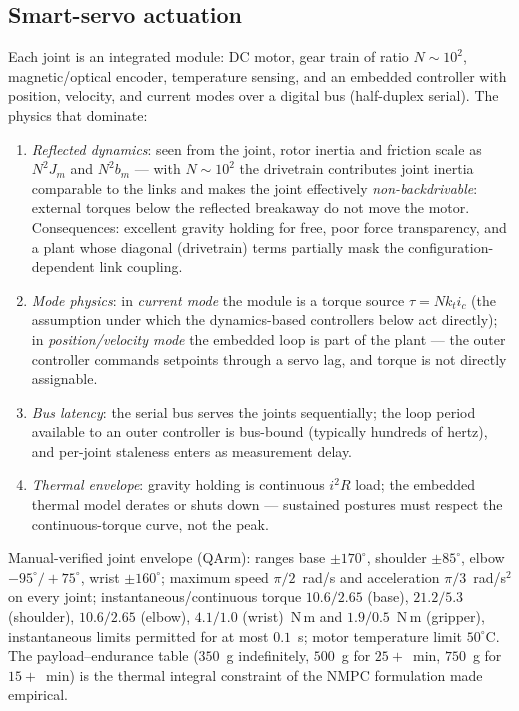 \documentclass[conference]{IEEEtran}
\begin{document}
\subsection{Smart-servo actuation}
Each joint is an integrated module: DC motor, gear train of ratio $N\!\sim\!10^2$, magnetic/optical encoder, temperature sensing, and an embedded controller with position, velocity, and current modes over a digital bus (half-duplex serial). The physics that dominate:
\begin{enumerate}[label=(\alph*)]
\item \emph{Reflected dynamics}: seen from the joint, rotor inertia and friction scale as $N^2 J_m$ and $N^2 b_m$ --- with $N\sim10^2$ the drivetrain contributes joint inertia comparable to the links and makes the joint effectively \emph{non-backdrivable}: external torques below the reflected breakaway do not move the motor. Consequences: excellent gravity holding for free, poor force transparency, and a plant whose diagonal (drivetrain) terms partially mask the configuration-dependent link coupling.
\item \emph{Mode physics}: in \emph{current mode} the module is a torque source $\tau = N k_t i_c$ (the assumption under which the dynamics-based controllers below act directly); in \emph{position/velocity mode} the embedded loop is part of the plant --- the outer controller commands setpoints through a servo lag, and torque is not directly assignable.
\item \emph{Bus latency}: the serial bus serves the joints sequentially; the loop period available to an outer controller is bus-bound (typically hundreds of hertz), and per-joint staleness enters as measurement delay.
\item \emph{Thermal envelope}: gravity holding is continuous $i^2R$ load; the embedded thermal model derates or shuts down --- sustained postures must respect the continuous-torque curve, not the peak.
\end{enumerate}

Manual-verified joint envelope (QArm): ranges base $\pm170^\circ$, shoulder $\pm85^\circ$, elbow $-95^\circ/{+}75^\circ$, wrist $\pm160^\circ$; maximum speed $\pi/2$~rad/s and acceleration $\pi/3$~rad/s$^2$ on every joint; instantaneous/continuous torque $10.6/2.65$ (base), $21.2/5.3$ (shoulder), $10.6/2.65$ (elbow), $4.1/1.0$ (wrist)~N\,m and $1.9/0.5$~N\,m (gripper), instantaneous limits permitted for at most $0.1$~s; motor temperature limit $50^\circ$C. The payload--endurance table ($350$~g indefinitely, $500$~g for $25{+}$~min, $750$~g for $15{+}$~min) is the thermal integral constraint of the NMPC formulation made empirical.
\end{document}
